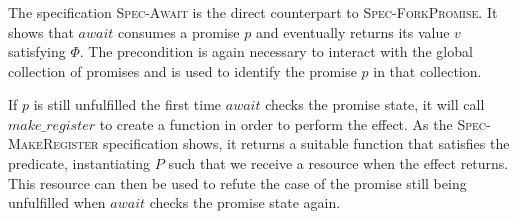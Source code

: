 
\subsubsection{}
\label{sec:sched-spec-await}

The specification \textsc{Spec-Await} is the direct counterpart to \textsc{Spec-ForkPromise}.
It shows that \(await\) consumes a promise \(p\) and eventually returns its value \(v\) satisfying \(\Phi\).
The precondition \gsPInv{} is again necessary to interact with the global collection of promises and \gsIsPr{} is used to identify the promise \(p\) in that collection.

If \(p\) is still unfulfilled the first time \(await\) checks the promise state, it will call \(make\_register\) to create a  function in order to perform the \esuspend{} effect.
As the \textsc{Spec-MakeRegister} specification shows, it returns a suitable function that satisfies the \gsIsReg{} predicate, instantiating \(P\) such that we receive a \gspdone{} resource when the effect returns.
This resource can then be used to refute the case of the promise still being unfulfilled when \(await\) checks the promise state again.


